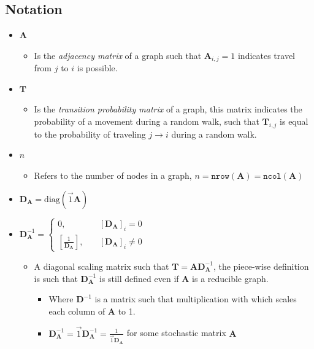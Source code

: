 \documentclass[11pt, twoside]{report}
\begin{document}
\subsection{Notation}
\label{notation}
\begin{itemize}
\item \(\mathbf{A}\)
\begin{itemize}
\item Is the \emph{adjacency matrix} of a graph such that \(\mathbf{A}_{i,j} = 1\) indicates travel from \(j\) to \(i\) is possible.
\end{itemize}
\item \(\mathbf{T}\)
\begin{itemize}
\item Is the \emph{transition probability matrix} of a graph, this matrix indicates the probability of a movement during a random walk, such that \(\mathbf{T}_{i,j}\) is equal to the probability of traveling \(j \rightarrow  i\) during a random walk.
\end{itemize}
\item \(n\)
\begin{itemize}
\item Refers to the number of nodes in a graph, \(n = \mathtt{nrow}\left(\mathbf{A}\right) = \mathtt{ncol}\left(\mathbf{A}\right)\)
\end{itemize}
\item \(\mathbf{D}_{\mathbf{A}}=\mathrm{diag}\left(\vec{1}\mathbf{A}\right)\)
\item \(\mathbf{D}_{\mathbf{A}}^{- 1}  =
   \begin{cases}
   0 ,& \quad \left[ \mathbf{D}_{\mathbf{A}} \right]_i = 0 \\
   \left[ \frac{1}{\mathbf{D}_{\mathbf{A}}} \right] ,& \enspace \enspace \left[ \mathbf{D}_{\mathbf{A}} \right]_i \neq 0
   \end{cases}\)
\begin{itemize}
\item A diagonal scaling matrix such that \(\mathbf{T} = \mathbf{A} \mathbf{D}_{\mathbf{A}}^{-1}\), the piece-wise definition is such that \(\mathbf{D}^{-1}_{\mathbf{A}}\) is still defined even if \(\mathbf{A}\) is a reducible graph.
\begin{itemize}
\item Where \(\mathbf{D}^{-1}\) is a matrix such that multiplication with which scales each column of \(\mathbf{A}\) to 1.
\item \(\mathbf{D}^{-1}_{\mathbf{A}} = \vec{1}\mathbf{D}^{-1}_{\mathbf{A}} = \frac{1}{\vec{1}\mathbf{D}_{\mathbf{A}}}\) for some stochastic matrix \(\mathbf{A}\)

\end{itemize}
\end{itemize}
\end{itemize}
\end{document}
